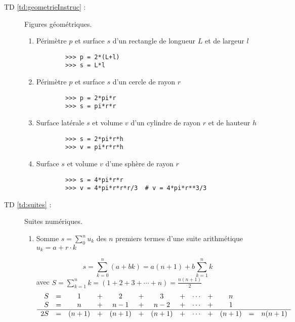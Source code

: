 \begin{description}
\item[TD \ref{td:geometrieInstruc} :] Figures géométriques.
	\begin{enumerate}
	\item Périmètre $p$ et surface $s$ d'un rectangle de longueur
		$L$ et de largeur $l$

		\begin{py}{12cm}
		\begin{verbatim}
		>>> p = 2*(L+l)
		>>> s = L*l
		\end{verbatim}
		\end{py}

	\item Périmètre $p$ et surface $s$ d'un cercle de rayon $r$

		\begin{py}{12cm}
		\begin{verbatim}
		>>> p = 2*pi*r
		>>> s = pi*r*r
		\end{verbatim}
		\end{py}

	\item Surface latérale $s$ et volume $v$ d'un cylindre de rayon $r$
		et de hauteur $h$

		\begin{py}{12cm}
		\begin{verbatim}
		>>> s = 2*pi*r*h
		>>> v = pi*r*r*h
		\end{verbatim}
		\end{py}

	\item Surface $s$ et volume $v$ d'une sphère de rayon $r$

		\begin{py}{12cm}
		\begin{verbatim}
		>>> s = 4*pi*r*r
		>>> v = 4*pi*r*r*r/3  # v = 4*pi*r**3/3
		\end{verbatim}
		\end{py}
	\end{enumerate}

\item[TD \ref{td:suites} :] Suites numériques.
	\begin{enumerate}
	\item Somme $s = \sum_0^n u_k$ des $n$ premiers termes d'une suite 
		arithmétique $u_k = a + r\cdot k$

	$$\displaystyle s = \sum_{k=0}^n (a + bk) = a(n+1) + b\sum_{k=1}^n k$$ 
	avec
	$\displaystyle S = \sum_{k=1}^n k = (1 + 2 + 3 + \cdots + n) =
	\frac{n(n+1)}{2}$
	$$\displaystyle\begin{array}[t]{rcccccccccccc}
	S &=& 1 &+& 2 &+& 3 &+& \cdots &+& n & & \\
	S &=& n &+& n-1 &+& n-2 &+& \cdots &+& 1 & & \\
	\hline
	2S &=& (n+1) &+& (n+1) &+& (n+1)&+& \cdots &+& (n+1) &=& n(n+1)\\
	\end{array}$$
	


\end{enumerate}
\end{description}
